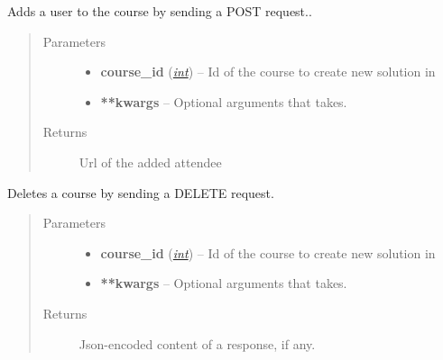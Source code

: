 \documentclass[letterpaper,10pt,english]{sphinxmanual}
\begin{document}
\begin{fulllineitems}
\label{web_portal:core.courses.api.attend_course}
Adds a user to the course by sending a POST request..
\begin{quote}\begin{description}
\item[{Parameters}] \leavevmode\begin{itemize}
\item {} 
\textbf{course\_id} (\href{http://docs.python.org/library/functions.html\#int}{\emph{int}}) -- Id of the course to create new solution in

\item {} 
\textbf{**kwargs} -- Optional arguments that  takes.

\end{itemize}

\item[{Returns}] \leavevmode
Url of the added attendee

\end{description}\end{quote}

\end{fulllineitems}


\begin{fulllineitems}
\label{web_portal:core.courses.api.delete_course}
Deletes a course by sending a DELETE request.
\begin{quote}\begin{description}
\item[{Parameters}] \leavevmode\begin{itemize}
\item {} 
\textbf{course\_id} (\href{http://docs.python.org/library/functions.html\#int}{\emph{int}}) -- Id of the course to create new solution in

\item {} 
\textbf{**kwargs} -- Optional arguments that  takes.

\end{itemize}

\item[{Returns}] \leavevmode
Json-encoded content of a response, if any.

\end{description}\end{quote}

\end{fulllineitems}
\end{document}
